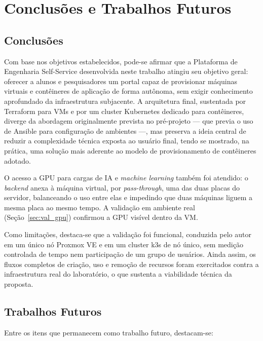 \chapter{Conclusões e Trabalhos Futuros}
\label{chapter:conclusoes_trabalhos_futuros}

\section{Conclusões}

Com base nos objetivos estabelecidos, pode-se afirmar que a Plataforma de Engenharia Self-Service desenvolvida neste trabalho atingiu seu objetivo geral: oferecer a alunos e pesquisadores um portal capaz de provisionar máquinas virtuais e contêineres de aplicação de forma autônoma, sem exigir conhecimento aprofundado da infraestrutura subjacente. A arquitetura final, sustentada por Terraform para VMs e por um cluster Kubernetes dedicado para contêineres, diverge da abordagem originalmente prevista no pré-projeto — que previa o uso de Ansible para configuração de ambientes —, mas preserva a ideia central de reduzir a complexidade técnica exposta ao usuário final, tendo se mostrado, na prática, uma solução mais aderente ao modelo de provisionamento de contêineres adotado.

\par O acesso a GPU para cargas de IA e \textit{machine learning} também foi atendido: o \textit{backend} anexa à máquina virtual, por \textit{pass-through}, uma das duas placas do servidor, balanceando o uso entre elas e impedindo que duas máquinas liguem a mesma placa ao mesmo tempo. A validação em ambiente real (Seção~\ref{sec:val_gpu}) confirmou a GPU visível dentro da VM.

\par Como limitações, destaca-se que a validação foi funcional, conduzida pelo autor em um único nó Proxmox VE e em um cluster k3s de nó único, sem medição controlada de tempo nem participação de um grupo de usuários. Ainda assim, os fluxos completos de criação, uso e remoção de recursos foram exercitados contra a infraestrutura real do laboratório, o que sustenta a viabilidade técnica da proposta.

\section{Trabalhos Futuros}
\label{sec:trabalhos_futuros}

Entre os itens que permanecem como trabalho futuro, destacam-se:

